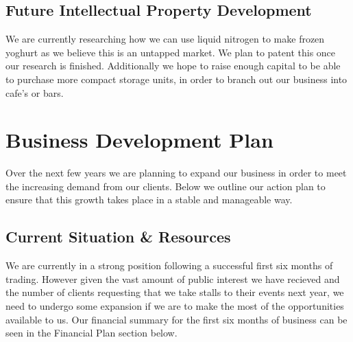 \documentclass{article}
\begin{document}
  \subsection{Future Intellectual Property Development}

  We are currently researching how we can use liquid nitrogen to make frozen yoghurt as we believe this is an untapped market. We plan to patent this once our research is finished. Additionally we hope to raise enough capital to be able to purchase more compact storage units, in order to branch out our business into cafe's or bars.


\section{Business Development Plan}

  Over the next few years we are planning to expand our business in order to meet the increasing demand from our clients. Below we outline our action plan to ensure that this growth takes place in a stable and manageable way.

  \subsection{Current Situation \& Resources}

  We are currently in a strong position following a successful first six months of trading. However given the vast amount of public interest we have recieved and the number of clients requesting that we take stalls to their events next year, we need to undergo some expansion if we are to make the most of the opportunities available to us. Our financial summary for the first six months of business can be seen in the Financial Plan section below. \\
\end{document}
